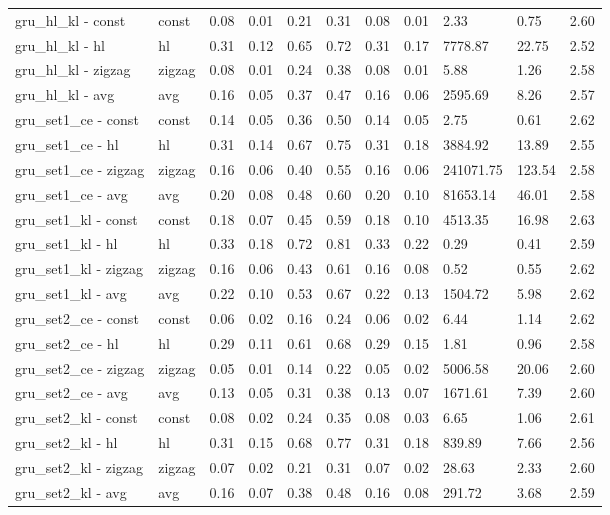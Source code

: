 \begin{longtable}{|p{1.3cm}|p{1.3cm}|p{1.3cm}|p{1.3cm}|p{1.3cm}|p{1.3cm}|p{1.3cm}|p{1.3cm}|p{1.3cm}|p{1.3cm}|p{1.3cm}|}
gru_hl_kl - const & const & 0.08 & 0.01 & 0.21 & 0.31 & 0.08 & 0.01 & 2.33 & 0.75 & 2.60 \\
gru_hl_kl - hl & hl & 0.31 & 0.12 & 0.65 & 0.72 & 0.31 & 0.17 & 7778.87 & 22.75 & 2.52 \\
gru_hl_kl - zigzag & zigzag & 0.08 & 0.01 & 0.24 & 0.38 & 0.08 & 0.01 & 5.88 & 1.26 & 2.58 \\
gru_hl_kl - avg & avg & 0.16 & 0.05 & 0.37 & 0.47 & 0.16 & 0.06 & 2595.69 & 8.26 & 2.57 \\
gru_set1_ce - const & const & 0.14 & 0.05 & 0.36 & 0.50 & 0.14 & 0.05 & 2.75 & 0.61 & 2.62 \\
gru_set1_ce - hl & hl & 0.31 & 0.14 & 0.67 & 0.75 & 0.31 & 0.18 & 3884.92 & 13.89 & 2.55 \\
gru_set1_ce - zigzag & zigzag & 0.16 & 0.06 & 0.40 & 0.55 & 0.16 & 0.06 & 241071.75 & 123.54 & 2.58 \\
gru_set1_ce - avg & avg & 0.20 & 0.08 & 0.48 & 0.60 & 0.20 & 0.10 & 81653.14 & 46.01 & 2.58 \\
gru_set1_kl - const & const & 0.18 & 0.07 & 0.45 & 0.59 & 0.18 & 0.10 & 4513.35 & 16.98 & 2.63 \\
gru_set1_kl - hl & hl & 0.33 & 0.18 & 0.72 & 0.81 & 0.33 & 0.22 & 0.29 & 0.41 & 2.59 \\
gru_set1_kl - zigzag & zigzag & 0.16 & 0.06 & 0.43 & 0.61 & 0.16 & 0.08 & 0.52 & 0.55 & 2.62 \\
gru_set1_kl - avg & avg & 0.22 & 0.10 & 0.53 & 0.67 & 0.22 & 0.13 & 1504.72 & 5.98 & 2.62 \\
gru_set2_ce - const & const & 0.06 & 0.02 & 0.16 & 0.24 & 0.06 & 0.02 & 6.44 & 1.14 & 2.62 \\
gru_set2_ce - hl & hl & 0.29 & 0.11 & 0.61 & 0.68 & 0.29 & 0.15 & 1.81 & 0.96 & 2.58 \\
gru_set2_ce - zigzag & zigzag & 0.05 & 0.01 & 0.14 & 0.22 & 0.05 & 0.02 & 5006.58 & 20.06 & 2.60 \\
gru_set2_ce - avg & avg & 0.13 & 0.05 & 0.31 & 0.38 & 0.13 & 0.07 & 1671.61 & 7.39 & 2.60 \\
gru_set2_kl - const & const & 0.08 & 0.02 & 0.24 & 0.35 & 0.08 & 0.03 & 6.65 & 1.06 & 2.61 \\
gru_set2_kl - hl & hl & 0.31 & 0.15 & 0.68 & 0.77 & 0.31 & 0.18 & 839.89 & 7.66 & 2.56 \\
gru_set2_kl - zigzag & zigzag & 0.07 & 0.02 & 0.21 & 0.31 & 0.07 & 0.02 & 28.63 & 2.33 & 2.60 \\
gru_set2_kl - avg & avg & 0.16 & 0.07 & 0.38 & 0.48 & 0.16 & 0.08 & 291.72 & 3.68 & 2.59 \\

\end{longtable}
